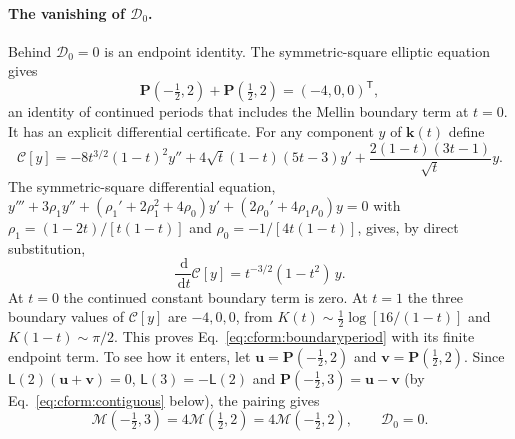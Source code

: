 \documentclass[11pt,a4paper]{article}
\numberwithin{equation}{section}
\newcommand{\dd}{\,\mathrm d}
\begin{document}
\paragraph{The vanishing of $\mathcal D_0$.} Behind $\mathcal D_0=0$ is an endpoint identity. The symmetric-square
elliptic equation gives
\begin{equation}
 \mathbf P(-\tfrac12,2)+\mathbf P(\tfrac12,2)=(-4,0,0)^{\mathsf T},
 \label{eq:cform:boundaryperiod}
\end{equation}
an identity of continued periods that includes the Mellin boundary term at $t=0$. It has an explicit differential
certificate. For any component $y$ of $\mathbf k(t)$ define
\begin{equation}
 \mathcal C[y]=-8t^{3/2}(1-t)^2y''+4\sqrt t(1-t)(5t-3)y'+\frac{2(1-t)(3t-1)}{\sqrt t}y.
\end{equation}
The symmetric-square differential equation,
$y'''+3\rho_1y''+(\rho_1'+2\rho_1^2+4\rho_0)y'+(2\rho_0'+4\rho_1\rho_0)y=0$ with $\rho_1=(1-2t)/[t(1-t)]$ and
$\rho_0=-1/[4t(1-t)]$, gives, by direct substitution,
\begin{equation}
 \frac{\dd}{\dd t}\mathcal C[y]=t^{-3/2}(1-t^2)\,y.
\end{equation}
At $t=0$ the continued constant boundary term is zero. At $t=1$ the three boundary values of $\mathcal C[y]$ are
$-4,0,0$, from $K(t)\sim\frac12\log[16/(1-t)]$ and $K(1-t)\sim\pi/2$. This proves Eq.~\eqref{eq:cform:boundaryperiod}
with its finite endpoint term. To see how it enters, let $\mathbf u=\mathbf P(-\frac12,2)$ and
$\mathbf v=\mathbf P(\frac12,2)$. Since $\mathsf L(2)(\mathbf u+\mathbf v)=0$, $\mathsf L(3)=-\mathsf L(2)$ and
$\mathbf P(-\frac12,3)=\mathbf u-\mathbf v$ (by Eq.~\eqref{eq:cform:contiguous} below), the pairing gives
\begin{equation}
 \mathcal M(-\tfrac12,3)=4\mathcal M(\tfrac12,2)=4\mathcal M(-\tfrac12,2),\qquad\mathcal D_0=0.
\end{equation}
\end{document}
